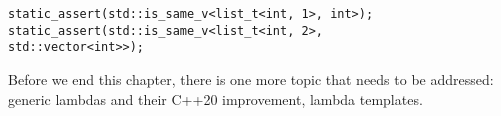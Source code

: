\begin{lstlisting}[style=styleCXX]
static_assert(std::is_same_v<list_t<int, 1>, int>);
static_assert(std::is_same_v<list_t<int, 2>,
std::vector<int>>);
\end{lstlisting}

Before we end this chapter, there is one more topic that needs to be addressed: generic lambdas and their C++20 improvement, lambda templates.




















